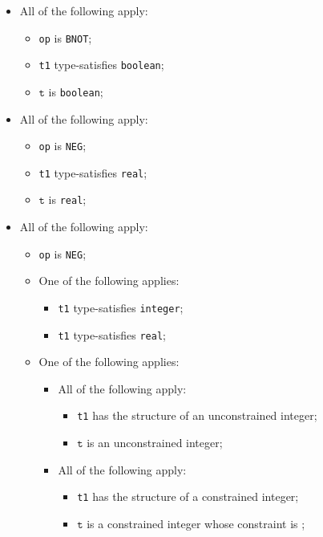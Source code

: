\documentclass{book}
\newcommand\vt[0]{\texttt{t}}
\begin{document}
  \begin{itemize}
  \item All of the following apply:
    \begin{itemize}
      \item \texttt{op} is \texttt{BNOT};
      \item \texttt{t1} type-satisfies \texttt{boolean};
      \item $\vt$ is \texttt{boolean};
    \end{itemize}

  \item All of the following apply:
  \begin{itemize}
    \item \texttt{op} is \texttt{NEG};
    \item \texttt{t1} type-satisfies \texttt{real};
    \item $\vt$ is \texttt{real};
  \end{itemize}

  \item All of the following apply:
    \begin{itemize}
    \item \texttt{op} is \texttt{NEG};
    \item One of the following applies:
      \begin{itemize}
      \item \texttt{t1} type-satisfies \texttt{integer};
      \item \texttt{t1} type-satisfies \texttt{real};
      \end{itemize}
     \item One of the following applies:
       \begin{itemize}
       \item All of the following apply:
         \begin{itemize}
         \item \texttt{t1} has the structure of an unconstrained integer;
         \item $\vt$ is an unconstrained integer;
         \end{itemize}
       \item All of the following apply:
         \begin{itemize}
         \item \texttt{t1} has the structure of a constrained integer;
         \item $\vt$ is a constrained integer whose constraint is ;
         \end{itemize}
       \end{itemize}
    \end{itemize}


\end{itemize}
\end{document}
